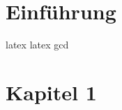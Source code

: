 \documentclass[../main.tex]{subfiles}
\begin{document}

\section{Einführung}
\cite{sansom1958history}
\gls{latex}
\Gls{latex}
\acrshort{gcd}
\lipsum[1-2]

\newpage
\section{Kapitel 1}
\end{document}
